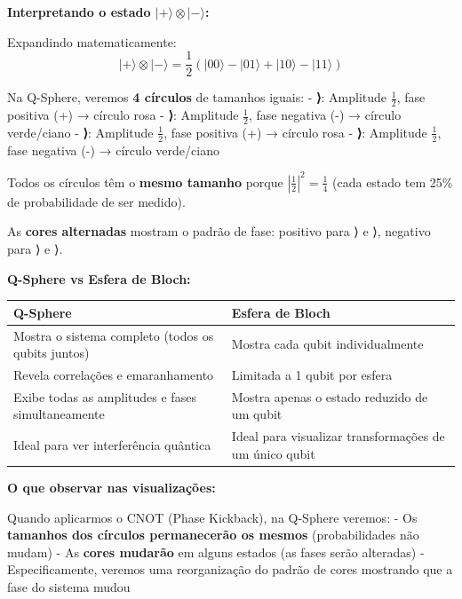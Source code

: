 \documentclass[
  brazilian,
]{report}
\newcounter{none} %
\begin{document}
\textbf{Interpretando o estado \(|+\rangle \otimes |-\rangle\):}

Expandindo matematicamente:
\[|+\rangle \otimes |-\rangle = \frac{1}{2}(|00\rangle - |01\rangle + |10\rangle - |11\rangle)\]

Na Q-Sphere, veremos \textbf{4 círculos} de tamanhos iguais: -
\textbf{⟩}: Amplitude \(\frac{1}{2}\), fase positiva (+) →
círculo rosa - \textbf{⟩}: Amplitude \(\frac{1}{2}\), fase
negativa (-) → círculo verde/ciano - \textbf{⟩}: Amplitude
\(\frac{1}{2}\), fase positiva (+) → círculo rosa -
\textbf{⟩}: Amplitude \(\frac{1}{2}\), fase negativa (-) →
círculo verde/ciano

Todos os círculos têm o \textbf{mesmo tamanho} porque
\(|\frac{1}{2}|^2 = \frac{1}{4}\) (cada estado tem 25\% de probabilidade
de ser medido).

As \textbf{cores alternadas} mostram o padrão de fase: positivo para
⟩ e ⟩, negativo para ⟩ e ⟩.

\textbf{Q-Sphere vs Esfera de Bloch:}

{\def\LTcaptype{none} %
\begin{longtable}[]{@{}
  >{\raggedright\arraybackslash}p{}
  >{\raggedright\arraybackslash}p{}@{}}
\toprule\noalign{}
\begin{minipage}[b]{\linewidth}\raggedright
Q-Sphere
\end{minipage} & \begin{minipage}[b]{\linewidth}\raggedright
Esfera de Bloch
\end{minipage} \\
\midrule\noalign{}
\endhead
\bottomrule\noalign{}
\endlastfoot
Mostra o sistema completo (todos os qubits juntos) & Mostra cada qubit
individualmente \\
Revela correlações e emaranhamento & Limitada a 1 qubit por esfera \\
Exibe todas as amplitudes e fases simultaneamente & Mostra apenas o
estado reduzido de um qubit \\
Ideal para ver interferência quântica & Ideal para visualizar
transformações de um único qubit \\
\end{longtable}
}

\textbf{O que observar nas visualizações:}

Quando aplicarmos o CNOT (Phase Kickback), na Q-Sphere veremos: - Os
\textbf{tamanhos dos círculos permanecerão os mesmos} (probabilidades
não mudam) - As \textbf{cores mudarão} em alguns estados (as fases serão
alteradas) - Especificamente, veremos uma reorganização do padrão de
cores mostrando que a fase do sistema mudou
\end{document}
